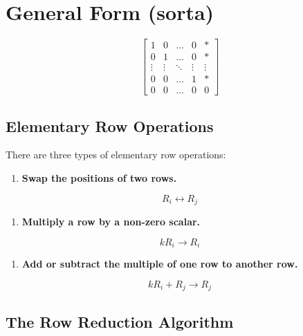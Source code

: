 \documentclass[
  letterpaper,
  DIV=11,
  numbers=noendperiod]{scrreprt}
\providecommand{\tightlist}{%
  \setlength{\itemsep}{0pt}\setlength{\parskip}{0pt}}\usepackage{longtable,booktabs,array}
\begin{document}
\chapter{General Form (sorta)}

\[
\begin{bmatrix}
    1 & 0 & \dots & 0 & * \\
    0 & 1 & \dots & 0 & * \\
    \vdots & \vdots & \ddots & \vdots & \vdots \\
    0 & 0 & \dots & 1 & * \\
    0 & 0 & \dots & 0 & 0
\end{bmatrix}
\]

\hypertarget{elementary-row-operations}{%
\section*{Elementary Row Operations}\label{elementary-row-operations}}


There are three types of elementary row operations:

\begin{enumerate}
\def\labelenumi{\arabic{enumi}.}
\tightlist
\item
  \textbf{Swap the positions of two rows.}
\end{enumerate}

\[
R_i \leftrightarrow R_j
\]

\begin{enumerate}
\def\labelenumi{\arabic{enumi}.}
\setcounter{enumi}{1}
\tightlist
\item
  \textbf{Multiply a row by a non-zero scalar.}
\end{enumerate}

\[
kR_i \rightarrow R_i
\]

\begin{enumerate}
\def\labelenumi{\arabic{enumi}.}
\setcounter{enumi}{2}
\tightlist
\item
  \textbf{Add or subtract the multiple of one row to another row.}
\end{enumerate}

\[
kR_i + R_j \rightarrow R_j
\]

\hypertarget{the-row-reduction-algorithm}{%
\section*{The Row Reduction
Algorithm}\label{the-row-reduction-algorithm}}
\end{document}
